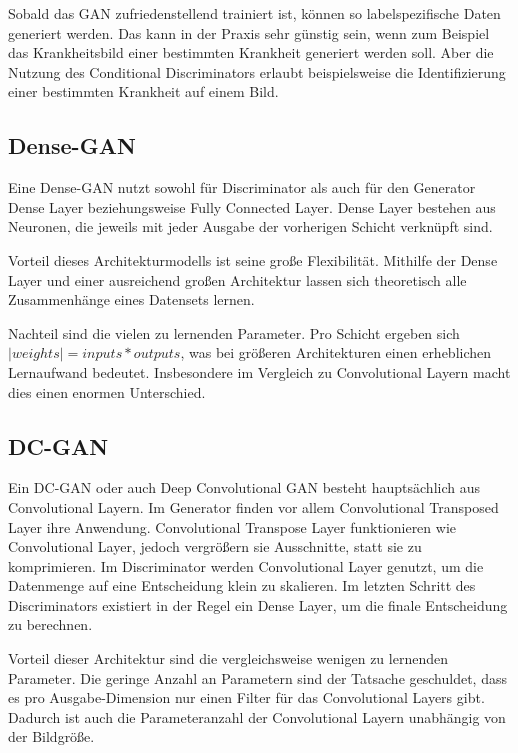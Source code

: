 Sobald das GAN zufriedenstellend trainiert ist, können so labelspezifische Daten generiert werden.
Das kann in der Praxis sehr günstig sein, wenn zum Beispiel das Krankheitsbild einer bestimmten Krankheit generiert werden soll.
Aber die Nutzung des Conditional Discriminators erlaubt beispielsweise die Identifizierung einer bestimmten Krankheit auf einem Bild.

\subsection{Dense-GAN}
Eine Dense-GAN nutzt sowohl für Discriminator als auch für den Generator Dense Layer beziehungsweise Fully Connected Layer.
Dense Layer bestehen aus Neuronen, die jeweils mit jeder Ausgabe der vorherigen Schicht verknüpft sind.
\newline

Vorteil dieses Architekturmodells ist seine große Flexibilität.
Mithilfe der Dense Layer und einer ausreichend großen Architektur lassen sich theoretisch alle Zusammenhänge eines Datensets lernen.

Nachteil sind die vielen zu lernenden Parameter.
Pro Schicht ergeben sich $|weights| = inputs * outputs$, was bei größeren Architekturen einen erheblichen Lernaufwand bedeutet.
Insbesondere im Vergleich zu Convolutional Layern macht dies einen enormen Unterschied.

\subsection{DC-GAN}
Ein DC-GAN oder auch Deep Convolutional GAN besteht hauptsächlich aus Convolutional Layern.
Im Generator finden vor allem Convolutional Transposed Layer ihre Anwendung.
Convolutional Transpose Layer funktionieren wie Convolutional Layer, jedoch vergrößern sie Ausschnitte, statt sie zu komprimieren.
Im Discriminator werden Convolutional Layer genutzt, um die Datenmenge auf eine Entscheidung klein zu skalieren.
Im letzten Schritt des Discriminators existiert in der Regel ein Dense Layer, um die finale Entscheidung zu berechnen.
\newline

Vorteil dieser Architektur sind die vergleichsweise wenigen zu lernenden Parameter.
Die geringe Anzahl an Parametern sind der Tatsache geschuldet, dass es pro Ausgabe-Dimension nur einen Filter für das Convolutional Layers gibt.
Dadurch ist auch die Parameteranzahl der Convolutional Layern unabhängig von der Bildgröße.

